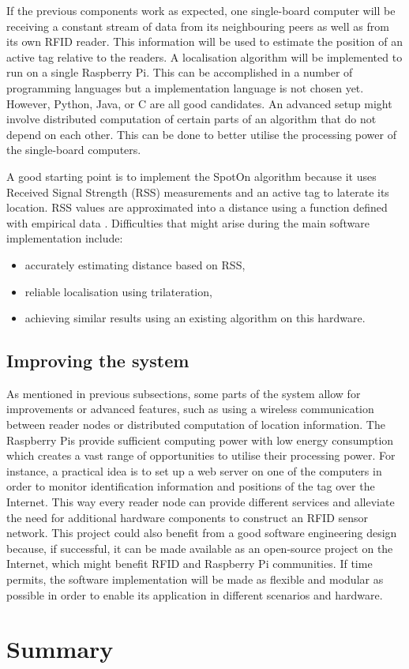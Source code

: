 If the previous components work as expected, one single-board computer will be receiving a constant stream of data from its neighbouring peers as well as from its own RFID reader. This information will be used to estimate the position of an active tag relative to the readers. A localisation algorithm will be implemented to run on a single Raspberry Pi. This can be accomplished in a number of programming languages but a implementation language is not chosen yet. However, Python, Java, or C are all good candidates. An advanced setup might involve distributed computation of certain parts of an algorithm that do not depend on each other. This can be done to better utilise the processing power of the single-board computers.

A good starting point is to implement the SpotOn \cite{Hightower2000} algorithm because it uses Received Signal Strength (RSS) measurements and an active tag to laterate its location. RSS values are approximated into a distance using a function defined with empirical data \cite{Bouet2008}. Difficulties that might arise during the main software implementation include:

\begin{itemize}
 	\item accurately estimating distance based on RSS,
 	\item reliable localisation using trilateration,
 	\item achieving similar results using an existing algorithm on this hardware.
\end{itemize}

\subsection{Improving the system}

As mentioned in previous subsections, some parts of the system allow for improvements or advanced features, such as using a wireless communication between reader nodes or distributed computation of location information. The Raspberry Pis provide sufficient computing power with low energy consumption which creates a vast range of opportunities to utilise their processing power. For instance, a practical idea is to set up a web server on one of the computers in order to monitor identification information and positions of the tag over the Internet. This way every reader node can provide different services and alleviate the need for additional hardware components to construct an RFID sensor network. This project could also benefit from a good software engineering design because, if successful, it can be made available as an open-source project on the Internet, which might benefit RFID and Raspberry Pi communities. If time permits, the software implementation will be made as flexible and modular as possible in order to enable its application in different scenarios and hardware.


\section{Summary}
